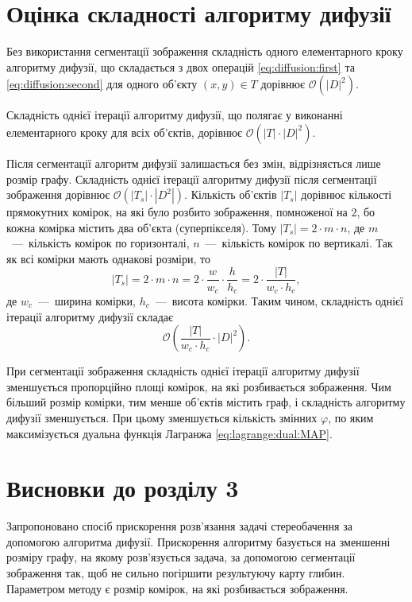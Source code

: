\section{Оцінка складності алгоритму дифузії}

Без використання сегментації зображення складність
одного елементарного кроку алгоритму дифузії,
що складається з двох операцій \eqref{eq:diffusion:first} та
\eqref{eq:diffusion:second} для одного об'єкту $\left(x, y \right) \in T$
дорівнює $\mathcal{O} \left( \left| D \right|^2 \right)$.

Складність однієї ітерації алгоритму дифузії,
що полягає у виконанні елементарного кроку для всіх об'єктів,
дорівнює $\mathcal{O} \left(\left|T \right| \cdot \left|D\right|^2 \right)$.

Після сегментації алгоритм дифузії залишається без змін,
відрізняється лише розмір графу.
Складність однієї ітерації алгоритму дифузії
після сегментації зображення дорівнює
$\mathcal{O} \left( \left| T_s \right| \cdot \left| D^2 \right| \right)$.
Кількість об'єктів $\left| T_s \right|$ дорівнює кількості прямокутних комірок,
на які було розбито зображення, помноженої на $2$,
бо кожна комірка містить два об'єкта (суперпікселя).
Тому $\left| T_s \right| = 2 \cdot m \cdot n$,
де $m$~---~кількість комірок по горизонталі,
$n$~---~кількість комірок по вертикалі.
Так як всі комірки мають однакові розміри, то
\begin{equation*}
    \left| T_s \right| =
    2 \cdot m \cdot n =
    2 \cdot \frac{w}{w_c} \cdot \frac{h}{h_c} =
    2 \cdot \frac{\left| T \right|}{w_c \cdot h_c},
\end{equation*}
де $w_c$~---~ширина комірки, $h_c$~---~висота комірки.
Таким чином, складність однієї ітерації алгоритму дифузії складає
\begin{equation} \label{eq:diffusion:superpixel:complexity}
    \mathcal{O} \left(
        \frac{\left| T \right|}{w_c \cdot h_c} \cdot \left| D \right|^2
    \right).
\end{equation}

При сегментації зображення складність однієї ітерації алгоритму дифузії
зменшується пропорційно площі комірок, на які розбивається зображення.
Чим більший розмір комірки, тим менше об'єктів містить граф,
і складність алгоритму дифузії зменшується.
При цьому зменшується кількість змінних $\varphi$,
по яким максимізується дуальна функція Лагранжа \eqref{eq:lagrange:dual:MAP}.

\section*{Висновки до розділу 3}

Запропоновано спосіб прискорення розв'язання задачі стереобачення
за допомогою алгоритма дифузії.
Прискорення алгоритму базується на зменшенні розміру графу,
на якому розв'язується задача, за допомогою сегментації зображення так,
щоб не сильно погіршити результуючу карту глибин.
Параметром методу є розмір комірок, на які розбивається зображення.
